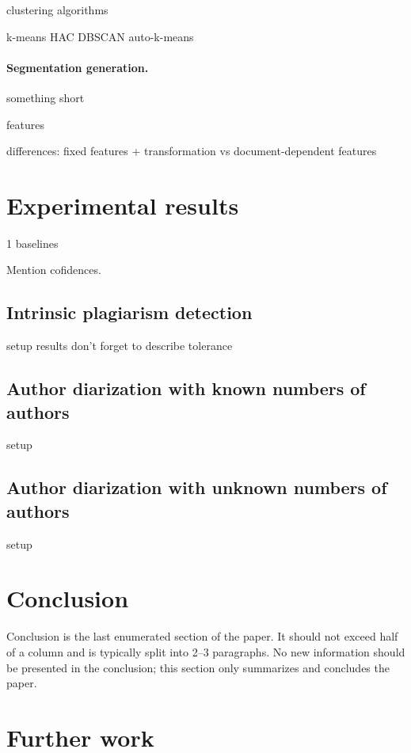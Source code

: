 \documentclass[10pt, a4paper]{article}
\begin{document}
clustering algorithms

k-means HAC DBSCAN auto-k-means

\paragraph{Segmentation generation.} something short


features

differences: fixed features + transformation vs document-dependent features

\section{Experimental results}

1
baselines

Mention cofidences.

\subsection{Intrinsic plagiarism detection}

setup
results
don't forget to describe tolerance

\subsection{Author diarization with known numbers of authors}

setup

\subsection{Author diarization with unknown numbers of authors}

setup

\section{Conclusion}

Conclusion is the last enumerated section of the paper. It should not exceed half of a column and is typically split into 2--3 paragraphs. No new information should be presented in the conclusion; this section only summarizes and concludes the paper.

\section{Further work}
\end{document}
